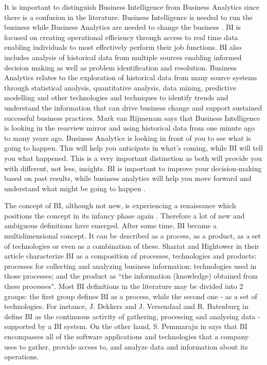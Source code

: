 \documentclass[runningheads]{llncs}
\begin{document}
It is important to distinguish Business Intelligence from Business Analytics since there is a confusion in the literature.  Business Intelligence is needed to run the business while Business Analytics are needed to change the business \cite{HEINZE}. BI is focused on creating operational efficiency through access to real time data enabling individuals to most effectively perform their job functions. BI also includes analysis of historical data from multiple sources enabling informed decision making as well as problem identification and resolution. Business Analytics relates to the exploration of historical data from many source systems through statistical analysis, quantitative analysis, data mining, predictive modelling and other technologies and techniques to identify trends and understand the information that can drive business change and support sustained successful business practices. Mark van Rijmenam says that Business Intelligence is looking in the rearview mirror and using historical data from one minute ago to many years ago. Business Analytics is looking in front of you to see what is going to happen. This will help you anticipate in what’s coming, while BI will tell you what happened. This is a very important distinction as both will provide you with different, not less, insights. BI is important to improve your decision-making based on past results, while business analytics will help you move forward and understand what might be going to happen \cite{HEINZE}.

The concept of BI, although not new, is experiencing a renaissance which positions the concept in its infancy phase again \cite{SHOLLO}. Therefore a lot of new and ambiguous definitions have emerged. After some time, BI became a multidimensional concept. It can be described as a process, as a product, as a set of technologies or even as a combination of these. Shariat and Hightower in their article \cite{SHARIAT} characterize BI as a composition of processes, technologies and products: processes for collecting and analyzing business information; technologies used in those processes; and the product as “the information (knowledge) obtained from these processes". Most BI definitions in the literature may be divided into 2 groups: the first group defines BI as a process, while the second one - as a set of technologies. For instance, J. Dekkers and J. Versendaal and R. Batenburg in \cite{DEKKERS} define BI as the continuous activity of gathering, processing and analysing data - supported by a BI system. On the other hand, S. Pemmaraju in \cite{RELATION} says that BI encompasses all of the software applications and technologies that a company uses to gather, provide access to, and analyze data and information about its operations. 
\end{document}
